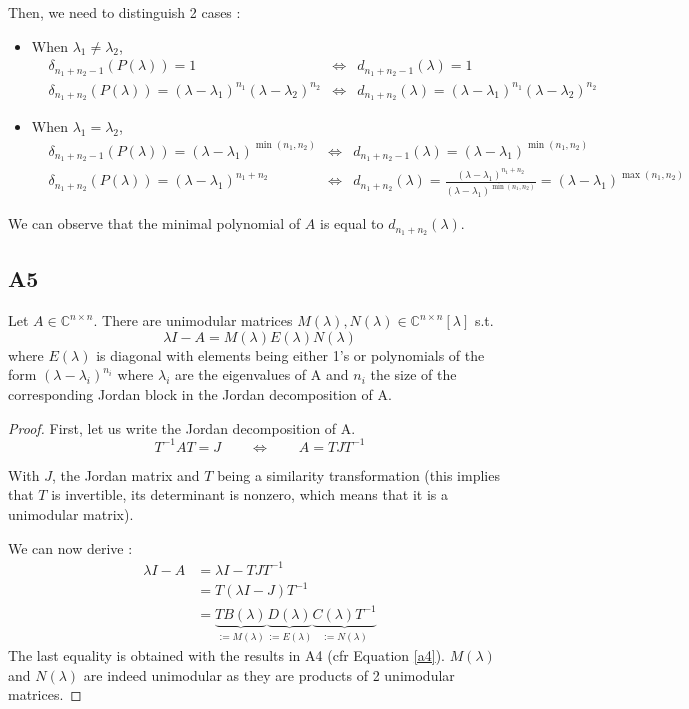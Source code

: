 \documentclass[11pt]{article}
\begin{document}
Then, we need to distinguish 2 cases : 
\begin{itemize}
\item When $\lambda_1 \neq \lambda_2$, \begin{align*}
&\delta_{n_1+n_2 - 1}(P(\lambda)) = 1  &\Leftrightarrow& d_{n_1+n_2-1}(\lambda) = 1\\
&\delta_{n_1+n_2}(P(\lambda)) = (\lambda -\lambda_{1})^{n_1}(\lambda -\lambda_{2})^{n_2} &\Leftrightarrow& d_{n_1+n_2}(\lambda) = (\lambda -\lambda_{1})^{n_1}(\lambda -\lambda_{2})^{n_2}
\end{align*}
\item When $\lambda_1 = \lambda_2$, \begin{align*}
&\delta_{n_1+n_2 - 1}(P(\lambda)) = (\lambda -\lambda_{1})^{\min(n_1,n_2)} &\Leftrightarrow& d_{n_1+n_2-1}(\lambda) = (\lambda -\lambda_{1})^{\min(n_1,n_2)}\\
&\delta_{n_1+n_2}(P(\lambda)) = (\lambda -\lambda_{1})^{n_1+n_2} &\Leftrightarrow& d_{n_1+n_2}(\lambda) = \frac{(\lambda -\lambda_{1})^{n_1+n_2}}{(\lambda -\lambda_{1})^{\min(n_1,n_2)}}=(\lambda -\lambda_{1})^{\max(n_1,n_2)}
\end{align*}
\end{itemize}

We can observe that the minimal polynomial of $A$ is equal to $d_{n_1+n_2}(\lambda)$.

\subsection*{A5}
Let $A\in \mathbb{C}^{n\times n}$. There are unimodular matrices $M(\lambda), N(\lambda) \in \mathbb{C}^{n\times n}[\lambda]$ s.t. 
\[\lambda I - A = M(\lambda)E(\lambda)N(\lambda)
\] where $E(\lambda)$ is diagonal with elements being either 1's or polynomials of the form $(\lambda - \lambda_i)^{n_i}$ where $ \lambda_i$ are the eigenvalues of A and $n_i$ the size of the corresponding Jordan block in the Jordan decomposition of A.

\begin{proof}
First, let us write the Jordan decomposition of A.
\[T^{-1} A T =J \qquad \Leftrightarrow \qquad A= T J T^{-1}
\]

With $J$, the Jordan matrix and $T$ being a similarity transformation (this implies that $T$ is invertible, its determinant is nonzero, which means that it is a unimodular matrix).

We can now derive :
\begin{align*}
\lambda I - A &= \lambda I - T J T^{-1}\\
&= T(\lambda I - J) T^{-1}\\
&= \underbrace{TB(\lambda)}_{:=M(\lambda)}\underbrace{D(\lambda)}_{:= E(\lambda)}\underbrace{C(\lambda)T^{-1}}_{:= N(\lambda)}
\end{align*}
The last equality is obtained with the results in A4 (cfr Equation \ref{a4}). 
$M(\lambda)$ and $N(\lambda)$ are indeed unimodular as they are products of 2 unimodular matrices.
\end{proof}
\end{document}
